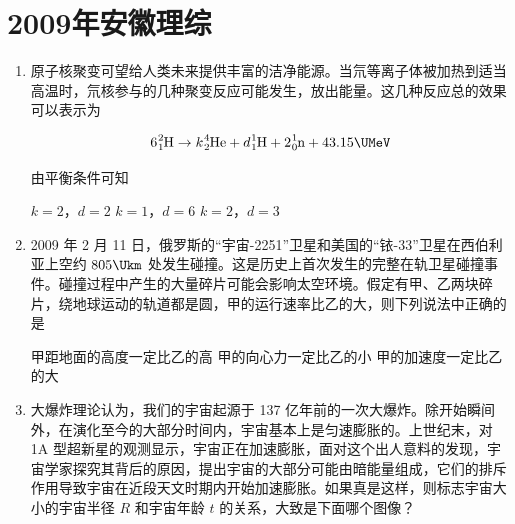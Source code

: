 \documentclass[\gkver]{gaokaozhenti}
\begin{document}
\chapter{2009年安徽理综}

\begin{enumerate}
\item
原子核聚变可望给人类未来提供丰富的洁净能源。当氘等离子体被加热到适当高温时，氘核参与的几种聚变反应可能发生，放出能量。这几种反应总的效果可以表示为

\[6\ce{^{2}_{1}H}\rightarrow k\ce{^{4}_{2}He}+d\ce{^{1}_{1}H}+2\ce{^{1}_{0}n}+43.15\UMeV\]

由平衡条件可知

{$k=2$，$d=2$}
{$k=1$，$d=6$}
{$k=2$，$d=3$}


\item
2009 年 2 月 11 日，俄罗斯的“宇宙-2251”卫星和美国的“铱-33”卫星在西伯利亚上空约 $805\Ukm$ 处发生碰撞。这是历史上首次发生的完整在轨卫星碰撞事件。碰撞过程中产生的大量碎片可能会影响太空环境。假定有甲、乙两块碎片，绕地球运动的轨道都是圆，甲的运行速率比乙的大，则下列说法中正确的是

{甲距地面的高度一定比乙的高}
{甲的向心力一定比乙的小}
{甲的加速度一定比乙的大}


\item
大爆炸理论认为，我们的宇宙起源于 137 亿年前的一次大爆炸。除开始瞬间外，在演化至今的大部分时间内，宇宙基本上是匀速膨胀的。上世纪末，对 1A 型超新星的观测显示，宇宙正在加速膨胀，面对这个出人意料的发现，宇宙学家探究其背后的原因，提出宇宙的大部分可能由暗能量组成，它们的排斥作用导致宇宙在近段天文时期内开始加速膨胀。如果真是这样，则标志宇宙大小的宇宙半径 $R$ 和宇宙年龄 $t$ 的关系，大致是下面哪个图像？


\end{enumerate}
\end{document}
